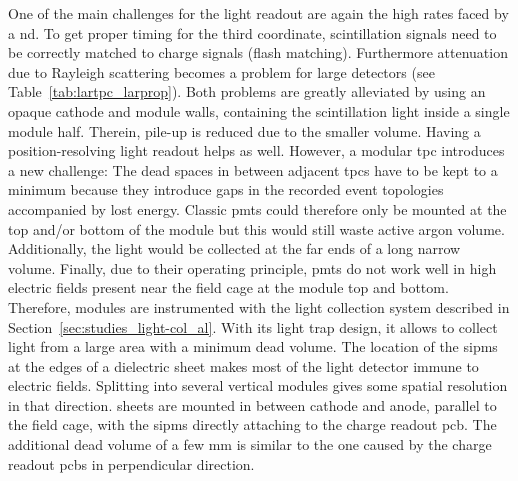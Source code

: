 One of the main challenges for the light readout are again the high rates faced by a \gls{nd}.
To get proper timing for the third coordinate, scintillation signals need to be correctly matched to charge signals (flash matching).
Furthermore attenuation due to Rayleigh scattering becomes a problem for large detectors (see Table~\ref{tab:lartpc_larprop}).
Both problems are greatly alleviated by using an opaque cathode and module walls, containing the scintillation light inside a single module half.
Therein, pile-up is reduced due to the smaller volume.
Having a position-resolving light readout helps as well.
However, a modular \gls{tpc} introduces a new challenge: The dead spaces in between adjacent \glspl{tpc} have to be kept to a minimum because they introduce gaps in the recorded event topologies accompanied by lost energy.
Classic \glspl{pmt} could therefore only be mounted at the top and/or bottom of the module but this would still waste active argon volume.
Additionally, the light would be collected at the far ends of a long narrow volume.
Finally, due to their operating principle, \glspl{pmt} do not work well in high electric fields present near the field cage at the module top and bottom.
Therefore, \AC{} modules are instrumented with the \AL{} light collection system described in Section~\ref{sec:studies_light-col_al}.
With its light trap design, it  allows to collect light from a large area with a minimum dead volume.
The location of the \glspl{sipm} at the edges of a dielectric sheet makes most of the light detector immune to electric fields.
Splitting \AL{} into several vertical modules gives some spatial resolution in that direction.
\AL{} sheets are mounted in between cathode and anode, parallel to the field cage, with the \glspl{sipm} directly attaching to the charge readout \gls{pcb}.
The additional dead volume of a few \si{\milli\metre} is similar to the one caused by the charge readout \glspl{pcb} in perpendicular direction.